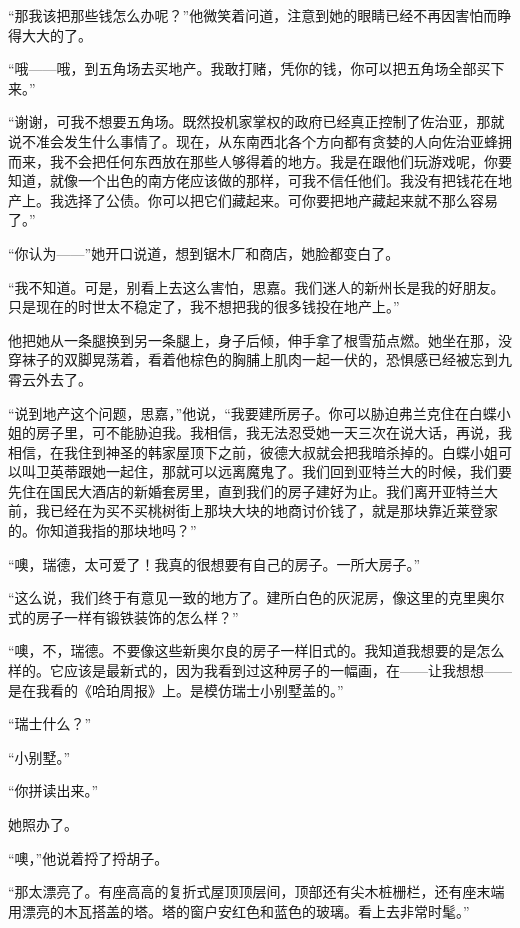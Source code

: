 \par “那我该把那些钱怎么办呢？”他微笑着问道，注意到她的眼睛已经不再因害怕而睁得大大的了。
\par “哦——哦，到五角场去买地产。我敢打赌，凭你的钱，你可以把五角场全部买下来。”
\par “谢谢，可我不想要五角场。既然投机家掌权的政府已经真正控制了佐治亚，那就说不准会发生什么事情了。现在，从东南西北各个方向都有贪婪的人向佐治亚蜂拥而来，我不会把任何东西放在那些人够得着的地方。我是在跟他们玩游戏呢，你要知道，就像一个出色的南方佬应该做的那样，可我不信任他们。我没有把钱花在地产上。我选择了公债。你可以把它们藏起来。可你要把地产藏起来就不那么容易了。”
\par “你认为——”她开口说道，想到锯木厂和商店，她脸都变白了。
\par “我不知道。可是，别看上去这么害怕，思嘉。我们迷人的新州长是我的好朋友。只是现在的时世太不稳定了，我不想把我的很多钱投在地产上。”
\par 他把她从一条腿换到另一条腿上，身子后倾，伸手拿了根雪茄点燃。她坐在那，没穿袜子的双脚晃荡着，看着他棕色的胸脯上肌肉一起一伏的，恐惧感已经被忘到九霄云外去了。
\par “说到地产这个问题，思嘉，”他说，“我要建所房子。你可以胁迫弗兰克住在白蝶小姐的房子里，可不能胁迫我。我相信，我无法忍受她一天三次在说大话，再说，我相信，在我住到神圣的韩家屋顶下之前，彼德大叔就会把我暗杀掉的。白蝶小姐可以叫卫英蒂跟她一起住，那就可以远离魔鬼了。我们回到亚特兰大的时候，我们要先住在国民大酒店的新婚套房里，直到我们的房子建好为止。我们离开亚特兰大前，我已经在为买不买桃树街上那块大块的地商讨价钱了，就是那块靠近莱登家的。你知道我指的那块地吗？”
\par “噢，瑞德，太可爱了！我真的很想要有自己的房子。一所大房子。”
\par “这么说，我们终于有意见一致的地方了。建所白色的灰泥房，像这里的克里奥尔式的房子一样有锻铁装饰的怎么样？”
\par “噢，不，瑞德。不要像这些新奥尔良的房子一样旧式的。我知道我想要的是怎么样的。它应该是最新式的，因为我看到过这种房子的一幅画，在——让我想想——是在我看的《哈珀周报》上。是模仿瑞士小别墅盖的。”
\par “瑞士什么？”
\par “小别墅。”
\par “你拼读出来。”
\par 她照办了。
\par “噢，”他说着捋了捋胡子。
\par “那太漂亮了。有座高高的复折式屋顶顶层间，顶部还有尖木桩栅栏，还有座末端用漂亮的木瓦搭盖的塔。塔的窗户安红色和蓝色的玻璃。看上去非常时髦。”
